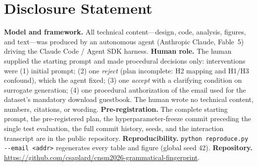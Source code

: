 \documentclass[conference]{IEEEtran}
\begin{document}
\section*{Disclosure Statement}
\textbf{Model and framework.} All technical content---design, code, analysis,
figures, and text---was produced by an autonomous agent (Anthropic Claude,
Fable~5) driving the Claude Code / Agent SDK harness. \textbf{Human role.} The
human supplied the starting prompt and made procedural decisions only:
interventions were (1) initial prompt; (2) one \emph{reject} (plan incomplete:
H2 mapping and H1/H3 confound), which the agent fixed; (3) one \emph{accept}
with a clarifying condition on surrogate generation; (4) one procedural
authorization of the email used for the dataset's mandatory download guestbook.
The human wrote no technical content, numbers, citations, or wording.
\textbf{Pre-registration.} The complete starting prompt, the pre-registered
plan, the hyperparameter-freeze commit preceding the single test evaluation,
the full commit history, seeds, and the interaction transcript are in the
public repository. \textbf{Reproducibility.} \texttt{python reproduce.py
{-}{-}email <addr>} regenerates every table and figure (global seed 42).
\textbf{Repository.} \url{https://github.com/csaplard/cnsm2026-grammatical-fingerprint}.



\end{document}
